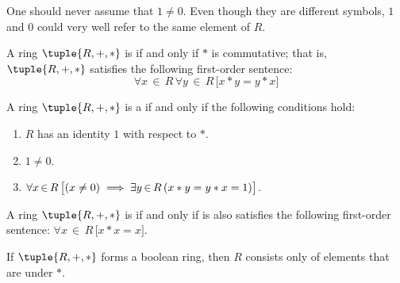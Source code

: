 \begin{rem}
    One should never assume that \( 1 \neq 0 \). Even though they are different symbols, \( 1 \) and \( 0 \) could very well refer to
    the same element of \( R \).
\end{rem}

\begin{dfn}
    \label{dfn:ring-commutative}
    A ring \( \tuple{R,+,\ast} \) is  if and only if \( \ast \) is commutative; that is,
    \( \tuple{R,+,\ast} \) satisfies the following first-order sentence:
    \begin{equation*}
        \forall x\,{\in}\,R \, \forall y\,{\in}\,R \, \big[ x \ast y = y \ast x \big]
    \end{equation*}
\end{dfn}

\begin{dfn}
    \label{dfn:ring-division}
    A ring \( \tuple{R,+,\ast} \) is a  if and only if the following conditions hold:
    \begin{enumerate}[topsep=2pt,noitemsep,label=\textup{\texttt{(\alph*)}}]
        \item \( R \) has an identity \( 1 \) with respect to \( \ast \).
        \item \( 1 \neq 0 \).
        \item \( \forall x\,{\in}\,R \, \big[ \mleft( x \neq 0 \mright) \implies \exists y\,{\in}\,R \, \mleft( x \ast y = y \ast x = 1 \mright) \big] \).
    \end{enumerate}
\end{dfn}

\begin{dfn}
    \label{dfn:ring-boolean}
    A ring \( \tuple{R,+,\ast} \) is  if and only if is also satisfies the following first-order sentence:
    \(  \forall x\,{\in}\,R \, \big[ x \ast x = x \big] \).
\end{dfn}

\begin{rem}
    If \( \tuple{R,+,\ast} \) forms a boolean ring, then \( R \) consists only of elements that are
     under \( \ast \).
\end{rem}

